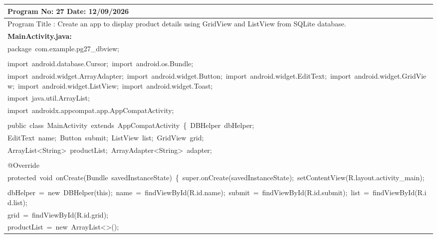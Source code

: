\documentclass[a4paper,12pt]{article}
\begin{document}
\noindent\begingroup
\renewcommand{\arraystretch}{1.1}
\begin{longtable}{|p{}|}
\hline\endfirsthead\hline\endhead\hline\endfoot\hline\endlastfoot
\rule{0pt}{13pt}Program No: 27 \hfill Date: 12/09/2026 \\
\hline
\rule{0pt}{13pt}Program Title : Create an app to display product details using GridView and ListView from SQLite database. \\
\hline
\rule{0pt}{13pt}\textbf{MainActivity.java:} \\
\hline
{\ttfamily\small package\ com.example.pg27\_dbview;} \\
\strut \\
{\ttfamily\small import\ android.database.Cursor;\ import\ android.os.Bundle;} \\
{\ttfamily\small import\ android.widget.ArrayAdapter;\ import\ android.widget.Button;\ import\ android.widget.EditText;\ import\ android.widget.GridView;\ import\ android.widget.ListView;\ import\ android.widget.Toast;} \\
{\ttfamily\small import\ java.util.ArrayList;} \\
{\ttfamily\small import\ androidx.appcompat.app.AppCompatActivity;} \\
\strut \\
{\ttfamily\small public\ class\ MainActivity\ extends\ AppCompatActivity\ \{\ DBHelper\ dbHelper;} \\
{\ttfamily\small EditText\ name;\ Button\ submit;\ ListView\ list;\ GridView\ grid;} \\
{\ttfamily\small ArrayList\textless{}String\textgreater{}\ productList;\ ArrayAdapter\textless{}String\textgreater{}\ adapter;} \\
\strut \\
{\ttfamily\small @Override} \\
{\ttfamily\small protected\ void\ onCreate(Bundle\ savedInstanceState)\ \{\ super.onCreate(savedInstanceState);\ setContentView(R.layout.activity\_main);} \\
\strut \\
{\ttfamily\small dbHelper\ =\ new\ DBHelper(this);\ name\ =\ findViewById(R.id.name);\ submit\ =\ findViewById(R.id.submit);\ list\ =\ findViewById(R.id.list);} \\
{\ttfamily\small grid\ =\ findViewById(R.id.grid);} \\
{\ttfamily\small productList\ =\ new\ ArrayList\textless{}\textgreater{}();} \\

\end{longtable}
\end{document}
